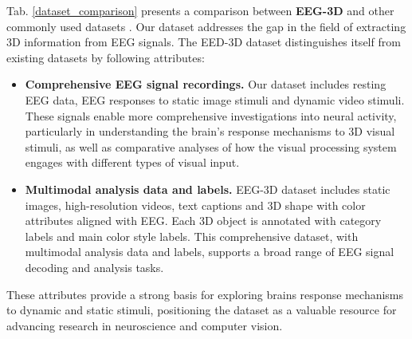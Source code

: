 Tab. \ref{dataset_comparison} presents a comparison between \textbf{EEG-3D} and other commonly used datasets \cite{horikawa2017generic,chang2019bold5000,wen2018neural,gao2023mind,kavasidis2017brain2image,gifford2022large,grootswagers2022human,allen2022massive}. Our dataset addresses the gap in the field of extracting 3D information from EEG signals. The EED-3D dataset distinguishes itself from existing datasets by following attributes: 
\begin{itemize}
	\item \textbf{Comprehensive EEG signal recordings.} Our dataset includes resting EEG data, EEG responses to static image stimuli and dynamic video stimuli. These signals enable more comprehensive investigations into neural activity, particularly in understanding the brain's response mechanisms to 3D visual stimuli, as well as comparative analyses of how the visual processing system engages with different types of visual input.
	\item \textbf{Multimodal analysis data and labels.} EEG-3D dataset includes static images, high-resolution videos, text captions and 
	3D shape with color attributes
	aligned with EEG. Each 3D object is annotated with category labels and main color style labels. This comprehensive dataset, with multimodal analysis data and labels, supports a broad range of EEG signal decoding and analysis tasks.
\end{itemize}

These attributes provide a strong basis for exploring brains response mechanisms to dynamic and static stimuli, 
positioning the dataset as a valuable resource for advancing research in neuroscience and computer vision.
